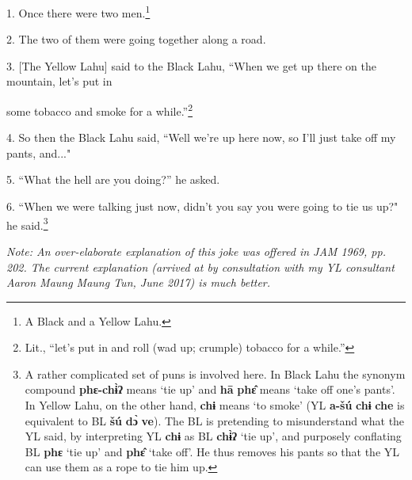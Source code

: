 \setcounter{footnote}{0}

1. Once there were two men.\footnote{A Black and a Yellow Lahu.}

2. The two of them were going together along a road.

3. [The Yellow Lahu] said to the Black Lahu, ``When we get up there on the
mountain, let's put in

some tobacco and smoke for a while.''\footnote{Lit., ``let's put in and roll (wad up; crumple) tobacco for a while.''}

4. So then the Black Lahu said, ``Well we're up here now, so I'll just take
off my pants, and..."

5. ``What the hell are you doing?'' he asked.

6. ``When we were talking just now, didn't you say you were going to tie
us up?" he said.\footnote{A rather complicated set of puns is involved here. In Black Lahu the synonym compound \textbf{phɛ-chɨ̀ʔ} means `tie up' and \textbf{hā} \textbf{phɛ̂} means `take off one's pants'. In Yellow Lahu, on the other hand, \textbf{chɨ} means `to smoke' (YL \textbf{a-šú} \textbf{chɨ} \textbf{che} is equivalent to BL \textbf{šú} \textbf{dɔ̀} \textbf{ve}). The BL is pretending to misunderstand what the YL said, by interpreting YL \textbf{chɨ} as BL \textbf{chɨ̀ʔ} `tie up', and purposely conflating BL \textbf{phɛ} `tie up' and \textbf{phɛ̂} `take off'. He thus removes his pants so that the YL can use them as a rope to tie him up.}

\textit{Note: An over-elaborate explanation of this joke was offered in JAM 1969,
pp. 202. The current explanation (arrived at by consultation with my YL consultant
Aaron Maung Maung Tun, June 2017) is much better.}

